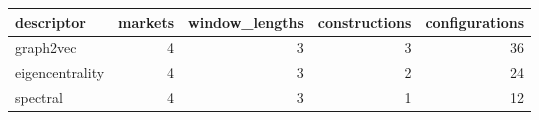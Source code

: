 \begin{tabular}{lrrrr}
\toprule
descriptor & markets & window\_lengths & constructions & configurations \\
\midrule
graph2vec & 4 & 3 & 3 & 36 \\
eigencentrality & 4 & 3 & 2 & 24 \\
spectral & 4 & 3 & 1 & 12 \\
\bottomrule
\end{tabular}

